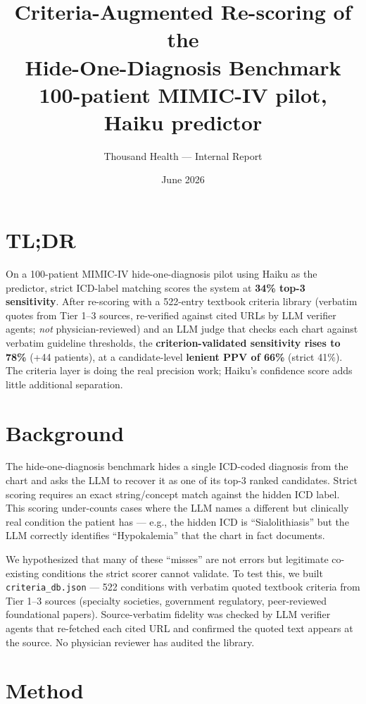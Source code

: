 \documentclass[11pt]{article}
\title{\textbf{Criteria-Augmented Re-scoring of the\\Hide-One-Diagnosis Benchmark}\\[0.5em]
\large 100-patient MIMIC-IV pilot, Haiku predictor}
\author{Thousand Health --- Internal Report}
\date{June 2026}
\begin{document}
\maketitle

\section*{TL;DR}
On a 100-patient MIMIC-IV hide-one-diagnosis pilot using Haiku as the predictor,
strict ICD-label matching scores the system at \textbf{34\% top-3 sensitivity}.
After re-scoring with a 522-entry textbook criteria library (verbatim quotes from
Tier 1--3 sources, re-verified against cited URLs by LLM verifier agents; \emph{not}
physician-reviewed) and an
LLM judge that checks each chart against verbatim guideline thresholds, the
\textbf{criterion-validated sensitivity rises to 78\%} (+44 patients), at a candidate-level
\textbf{lenient PPV of 66\%} (strict 41\%). The criteria layer is doing the real precision
work; Haiku's confidence score adds little additional separation.

\section{Background}
The hide-one-diagnosis benchmark hides a single ICD-coded diagnosis from the chart
and asks the LLM to recover it as one of its top-3 ranked candidates. Strict scoring
requires an exact string/concept match against the hidden ICD label. This scoring
under-counts cases where the LLM names a different but clinically real condition the
patient has --- e.g., the hidden ICD is ``Sialolithiasis'' but the LLM correctly identifies
``Hypokalemia'' that the chart in fact documents.

We hypothesized that many of these ``misses'' are not errors but legitimate co-existing
conditions the strict scorer cannot validate. To test this, we built
\texttt{criteria\_db.json} --- 522 conditions with verbatim quoted textbook criteria from
Tier 1--3 sources (specialty societies, government regulatory, peer-reviewed
foundational papers). Source-verbatim fidelity was checked by LLM verifier agents
that re-fetched each cited URL and confirmed the quoted text appears at the source.
No physician reviewer has audited the library.

\section{Method}
\end{document}
